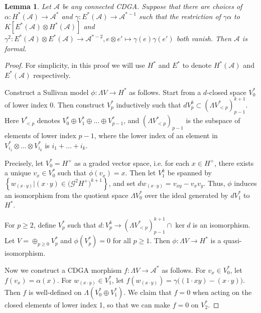 \documentclass{article}
\theoremstyle{plain}
\newtheorem{lem}[thm]{Lemma}
\theoremstyle{definition}
\theoremstyle{plain}
\numberwithin{equation}{section}
\begin{document}
\begin{lem}\label{vanishing uniform massey to formal}
Let $\mathcal{A}$ be any connected CDGA. Suppose that there are choices of $\alpha:H^*(\mathcal{A})\to \mathcal{A}^*$ and $\gamma:E^*(\mathcal{A})\to \mathcal{A}^{*-1}$ such that the restriction of $\gamma\alpha$ to $K[E^*(\mathcal{A})\otimes H^*(\mathcal{A})]$ and $\gamma^2: E^*(\mathcal{A})\otimes E^*(\mathcal{A})\to \mathcal{A}^{*-2}, e\otimes e' \mapsto \gamma(e)\gamma(e')$ both vanish. Then $\mathcal{A}$ is formal.
\end{lem}
\begin{proof}
For simplicity, in this proof we will use $H^*$ and $E^*$ to denote $H^*(\mathcal{A})$ and $E^*(\mathcal{A})$ respectively.

Construct a Sullivan model $\phi:\Lambda V \to H^*$ as follows. Start from a $d$-closed space $V^*_0$ of lower index 0. Then construct $V^*_p$ inductively such that $dV^k_p\subset (\Lambda V_{<p}^*)^{k+1}_{p-1}$. Here $V_{<p}^*$ denotes $V_0^*\oplus V_1^*\oplus\ldots\oplus V_{p-1}^*$, and $(\Lambda V_{<p}^*)_{p-1}$ is the subspace of elements of lower index $p-1$, where the lower index of an element in $V_{i_1}^*\otimes\ldots\otimes V_{i_k}^*$ is $i_1+\ldots+i_k$.

Precisely, let $V_0^*=H^+$ as a graded vector space, i.e. for each $x\in H^+$, there exists a unique $v_x\in V_0^*$ such that $\phi(v_x)=x$. Then let $V_1^k$ be spanned by $\left\{ w_{(x\cdot y)} |  (x\cdot y)\in\big(\mathcal{G}^2H^+\big)^{k+1} \right\}$, and set $dw_{(x\cdot y)}=v_{xy}-v_xv_y$. Thus, $\phi$ induces an isomorphism from the quotient space $\Lambda V_0^*$ over the ideal generated by $dV_1^*$ to $H^*$.

For $p\geq 2$, define $V_p^*$ such that $d: V^k_p \to (\Lambda V_{<p}^*)^{k+1}_{p-1}\cap \ker d$ is an isomorphism. Let $V=\oplus_{p\geq 0} V_p^*$ and $\phi(V_p^*)=0$ for all $p\geq 1$. Then $\phi:\Lambda V \to H^*$ is a quasi-isomorphism.

Now we construct a CDGA morphism $f:\Lambda V\to \mathcal{A}^*$ as follows. For $v_x\in V_0^*$, let $f(v_x)=\alpha(x)$. For $w_{(x\cdot y)}\in V_1^*$, let $f(w_{(x\cdot y)})=\gamma\big( (1\cdot xy)-(x\cdot y) \big)$. Then $f$ is well-defined on $\Lambda(V_0^*\oplus V_1^*)$. We claim that $f=0$ when acting on the closed elements of lower index 1, so that we can make $f=0$ on $V_2^*$.


\end{proof}
\end{document}

